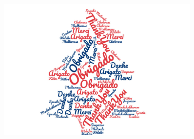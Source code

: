 \documentclass{beamer}
\begin{document}
\begin{frame}
    \begin{figure}
        \centering
        \includegraphics[width=0.9\textwidth]{figs/obrigado.pdf}
    \end{figure}
\end{frame}
\end{document}
